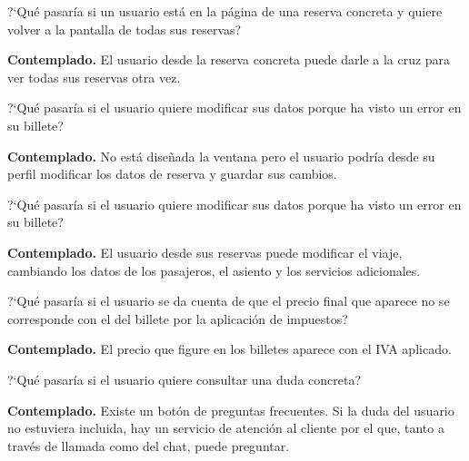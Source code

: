 \begin{escenario}
    \centering
    ?`Qué pasaría si un usuario está en la página de una reserva concreta y quiere volver a la pantalla de todas sus reservas?

    \begin{solucion}
        \centering
        \textbf{Contemplado.} El usuario desde la reserva concreta puede darle a la cruz para ver todas sus reservas otra vez.
    \end{solucion}
\end{escenario}

\begin{escenario}
    \centering
    ?`Qué pasaría si el usuario quiere modificar sus datos porque ha visto un error en su billete?

    \begin{solucion}
        \centering
        \textbf{Contemplado.} No está diseñada la ventana pero el usuario podría desde su perfil modificar los datos de reserva y guardar sus cambios.
    \end{solucion}
\end{escenario}

\begin{escenario}
    \centering
    ?`Qué pasaría si el usuario quiere modificar sus datos porque ha visto un error en su billete?

    \begin{solucion}
        \centering
        \textbf{Contemplado.} El usuario desde sus reservas puede modificar el viaje, cambiando los datos de los pasajeros, el asiento y los servicios adicionales.
    \end{solucion}
\end{escenario}

\begin{escenario}
    \centering
    ?`Qué pasaría si el usuario se da cuenta de que el precio final que aparece no se corresponde con el del billete por la aplicación de impuestos?

    \begin{solucion}
        \centering
        \textbf{Contemplado.} El precio que figure en los billetes aparece con el IVA aplicado.
    \end{solucion}
\end{escenario}

\begin{escenario}
    \centering
    ?`Qué pasaría si el usuario quiere consultar una duda concreta?

    \begin{solucion}
        \centering
        \textbf{Contemplado.} Existe un botón de preguntas frecuentes. Si la duda del usuario no estuviera incluida, hay un servicio de atención al cliente por el que, tanto a través de llamada como del chat, puede preguntar.
    \end{solucion}
\end{escenario}

